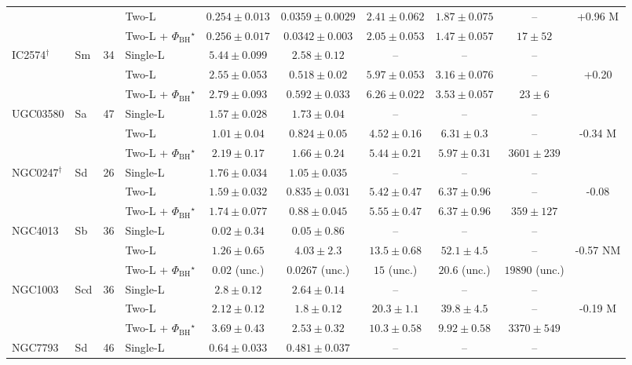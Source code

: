 \documentclass[9pt]{extarticle}
\begin{document}
{\begin{longtable}{llrlcccccc}
 & &  & Two-L & $0.254\pm0.013$ & $0.0359\pm0.0029$ & $2.41\pm0.062$ & $1.87\pm0.075$ & -- & +0.96 M\\
 & &  & Two-L + $\Phi_\mathrm{BH}$$^\star$ & $0.256\pm0.017$ & $0.0342\pm0.003$ & $2.05\pm0.053$ & $1.47\pm0.057$ & $17\pm52$ & \\
\midrule
IC2574$^\dagger$ & Sm & 34 & Single-L & $5.44\pm0.099$ & $2.58\pm0.12$ & -- & -- & -- & \\
 & &  & Two-L & $2.55\pm0.053$ & $0.518\pm0.02$ & $5.97\pm0.053$ & $3.16\pm0.076$ & -- & +0.20 \\
 & &  & Two-L + $\Phi_\mathrm{BH}$$^\star$ & $2.79\pm0.093$ & $0.592\pm0.033$ & $6.26\pm0.022$ & $3.53\pm0.057$ & $23\pm6$ & \\
\midrule
UGC03580 & Sa & 47 & Single-L & $1.57\pm0.028$ & $1.73\pm0.04$ & -- & -- & -- & \\
 & &  & Two-L & $1.01\pm0.04$ & $0.824\pm0.05$ & $4.52\pm0.16$ & $6.31\pm0.3$ & -- & -0.34 M\\
 & &  & Two-L + $\Phi_\mathrm{BH}$$^\star$ & $2.19\pm0.17$ & $1.66\pm0.24$ & $5.44\pm0.21$ & $5.97\pm0.31$ & $3601\pm239$ & \\
\midrule
NGC0247$^\dagger$ & Sd & 26 & Single-L & $1.76\pm0.034$ & $1.05\pm0.035$ & -- & -- & -- & \\
 & &  & Two-L & $1.59\pm0.032$ & $0.835\pm0.031$ & $5.42\pm0.47$ & $6.37\pm0.96$ & -- & -0.08 \\
 & &  & Two-L + $\Phi_\mathrm{BH}$$^\star$ & $1.74\pm0.077$ & $0.88\pm0.045$ & $5.55\pm0.47$ & $6.37\pm0.96$ & $359\pm127$ & \\
\midrule
NGC4013 & Sb & 36 & Single-L & $0.02\pm0.34$ & $0.05\pm0.86$ & -- & -- & -- & \\
 & &  & Two-L & $1.26\pm0.65$ & $4.03\pm2.3$ & $13.5\pm0.68$ & $52.1\pm4.5$ & -- & -0.57 NM\\
 & &  & Two-L + $\Phi_\mathrm{BH}$$^\star$ & $0.02$ (unc.) & $0.0267$ (unc.) & $15$ (unc.) & $20.6$ (unc.) & $19890$ (unc.) & \\
\midrule
NGC1003 & Scd & 36 & Single-L & $2.8\pm0.12$ & $2.64\pm0.14$ & -- & -- & -- & \\
 & &  & Two-L & $2.12\pm0.12$ & $1.8\pm0.12$ & $20.3\pm1.1$ & $39.8\pm4.5$ & -- & -0.19 M\\
 & &  & Two-L + $\Phi_\mathrm{BH}$$^\star$ & $3.69\pm0.43$ & $2.53\pm0.32$ & $10.3\pm0.58$ & $9.92\pm0.58$ & $3370\pm549$ & \\
\midrule
NGC7793 & Sd & 46 & Single-L & $0.64\pm0.033$ & $0.481\pm0.037$ & -- & -- & -- & \\

\end{longtable}}
\end{document}
